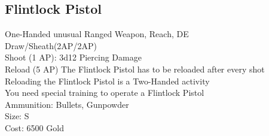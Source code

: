 \subsection{Flintlock Pistol}\label{weapon:flintlockPistol}
One-Handed unusual Ranged Weapon,  Reach, DE\\
Draw/Sheath(2AP/2AP)\\
Shoot (1 AP): 3d12 Piercing Damage\\
Reload (5 AP) The Flintlock Pistol has to be reloaded after every shot\\
Reloading the Flintlock Pistol is a Two-Handed activity\\
You need special training to operate a Flintlock Pistol\\
Ammunition: Bullets, Gunpowder\\
Size: S\\
Cost: 6500 Gold\\
